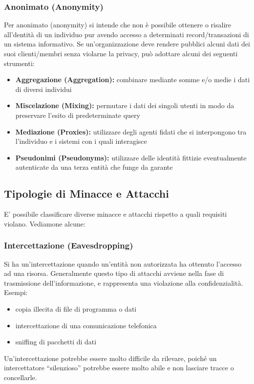 \subsubsection{Anonimato (Anonymity)}
Per anonimato (anonymity) si intende che non è possibile ottenere o risalire all’dentità di un individuo pur avendo accesso a determinati record/transazioni di un sistema informativo. Se un'organizzazione deve rendere pubblici alcuni dati dei suoi clienti/membri senza violarne la privacy, può adottare alcuni dei seguenti strumenti:
\begin{itemize} 
  \item \textbf{Aggregazione (Aggregation):} combinare mediante somme e/o medie i dati di diversi individui
  \item \textbf{Miscelazione (Mixing):} permutare i dati dei singoli utenti in modo da preservare l’esito di predeterminate query
  \item \textbf{Mediazione (Proxies):} utilizzare degli agenti fidati che si interpongono tra l’individuo e i sistemi con i quali interagisce
  \item \textbf{Pseudonimi (Pseudonyms):} utilizzare delle identità fittizie eventualmente autenticate da una terza entità che funge da garante 
\end{itemize}

\subsection{Tipologie di Minacce e Attacchi}
E' possibile classificare diverse minacce e attacchi rispetto a quali requisiti violano. Vediamone alcune:

\subsubsection{Intercettazione (Eavesdropping)}
Si ha un’intercettazione quando un’entità non autorizzata ha ottenuto l’accesso ad una risorsa. Generalmente questo tipo di attacchi avviene nella fase di trasmissione dell'informazione, e rappresenta una violazione alla confidenzialità. Esempi:
\begin{itemize} 
  \item copia illecita di file di programma o dati
  \item intercettazione di una comunicazione telefonica
  \item sniffing di pacchetti di dati
\end{itemize}
Un’intercettazione potrebbe essere molto difficile da rilevare, poiché un intercettatore “silenzioso” potrebbe essere molto abile e non lasciare tracce o concellarle. 

